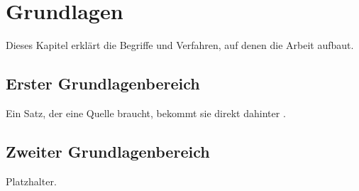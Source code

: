 
\chapter{Grundlagen}\label{ch:grundlagen}

Dieses Kapitel erklärt die Begriffe und Verfahren, auf denen die Arbeit aufbaut.

\section{Erster Grundlagenbereich}\label{sec:grundlagen-erster}

Ein Satz, der eine Quelle braucht, bekommt sie direkt dahinter \citep{lamport1994latex}.

\section{Zweiter Grundlagenbereich}\label{sec:grundlagen-zweiter}

Platzhalter.
